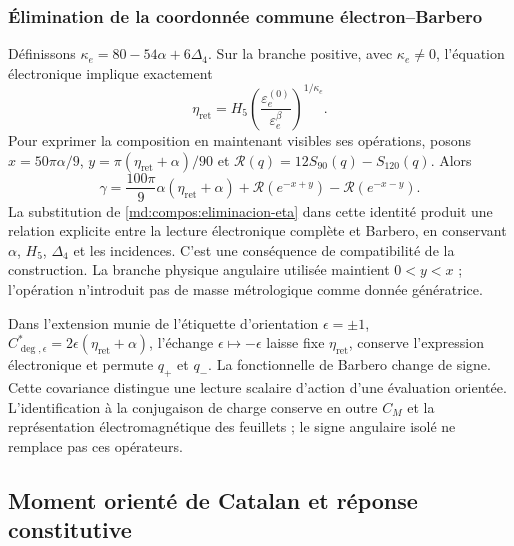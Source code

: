\subsubsection{Élimination de la coordonnée commune électron--Barbero}
\label{md:compos:eliminacion}

Définissons $\kappa_e=80-54\alpha+6\Delta_4$. Sur la branche positive, avec
$\kappa_e\neq0$, l’équation électronique implique exactement
\begin{equation}
 \eta_{\mathrm{ret}}=H_5
 \left(\frac{\varepsilon_e^{(0)}}{\varepsilon_e^\beta}\right)^{1/\kappa_e}.
 \label{md:compos:eliminacion-eta}
\end{equation}
Pour exprimer la composition en maintenant visibles ses opérations, posons
$x=50\pi\alpha/9$, $y=\pi(\eta_{\mathrm{ret}}+\alpha)/90$ et
$\mathcal R(q)=12S_{90}(q)-S_{120}(q)$. Alors
\begin{equation}
 \gamma=\frac{100\pi}{9}\alpha(\eta_{\mathrm{ret}}+\alpha)
 +\mathcal R(e^{-x+y})-\mathcal R(e^{-x-y}).
 \label{md:compos:barbero-eta}
\end{equation}
La substitution de \eqref{md:compos:eliminacion-eta} dans cette identité produit
une relation explicite entre la lecture électronique complète et Barbero,
en conservant $\alpha$, $H_5$, $\Delta_4$ et les incidences. C’est une conséquence
de compatibilité de la construction. La branche physique angulaire utilisée
maintient $0<y<x$ ; l’opération n’introduit pas de masse métrologique comme donnée
génératrice.

Dans l’extension munie de l’étiquette d’orientation $\epsilon=\pm1$,
$C^*_{\deg,\epsilon}=2\epsilon(\eta_{\mathrm{ret}}+\alpha)$, l’échange
$\epsilon\mapsto-\epsilon$ laisse fixe $\eta_{\mathrm{ret}}$, conserve
l’expression électronique et permute $q_+$ et $q_-$. La fonctionnelle de Barbero change
de signe. Cette covariance distingue une lecture scalaire d’action d’une
évaluation orientée. L’identification à la conjugaison de charge conserve
en outre $C_M$ et la représentation électromagnétique des feuillets ; le signe angulaire
isolé ne remplace pas ces opérateurs.

\subsection{Moment orienté de Catalan et réponse constitutive}
\label{md:compos:catalan}

